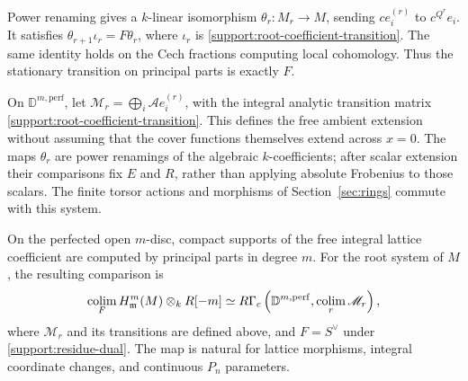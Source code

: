 Power renaming gives a $k$-linear isomorphism
$\theta_r:M_r\to M$, sending $c e_i^{(r)}$ to $c^{Q^r}e_i$.
It satisfies $\theta_{r+1}\iota_r=F\theta_r$, where $\iota_r$
is \eqref{support:root-coefficient-transition}.  The same identity
holds on the Cech fractions computing local cohomology.  Thus the
stationary transition on principal parts is exactly $F$.

On $\mathbb D^{m,\mathrm{perf}}$, let
$\mathscr M_r=\bigoplus_i\mathscr A e_i^{(r)}$, with the integral
analytic transition matrix \eqref{support:root-coefficient-transition}.
This defines the free ambient extension without assuming that the
cover functions themselves extend across $x=0$.  The maps $\theta_r$
are power renamings of the algebraic $k$-coefficients; after scalar
extension their comparisons fix $E$ and $R$, rather than applying
absolute Frobenius to those scalars.  The finite torsor actions and
morphisms of Section~\ref{sec:rings} commute with this system.

\begin{lemma}\label{support:principal-parts}
On the perfected open $m$-disc, compact supports of the free
integral lattice coefficient are computed by principal parts in
degree $m$.  For the root system of $M$, the resulting comparison is
\begin{equation}\label{support:principal-parts-comparison}
 \operatorname*{colim}_{F} H^m_{\mathfrak m}(M)\otimes_kR[-m]
 \simeq R\Gamma_c\left(\mathbb D^{m,\mathrm{perf}},
                    \operatorname*{colim}_r\mathscr M_r\right),
\end{equation}
where $\mathscr M_r$ and its transitions are defined above, and
$F=S^\vee$ under \eqref{support:residue-dual}.
The map is natural for lattice
morphisms, integral coordinate changes, and continuous $P_n$
parameters.
\end{lemma}

